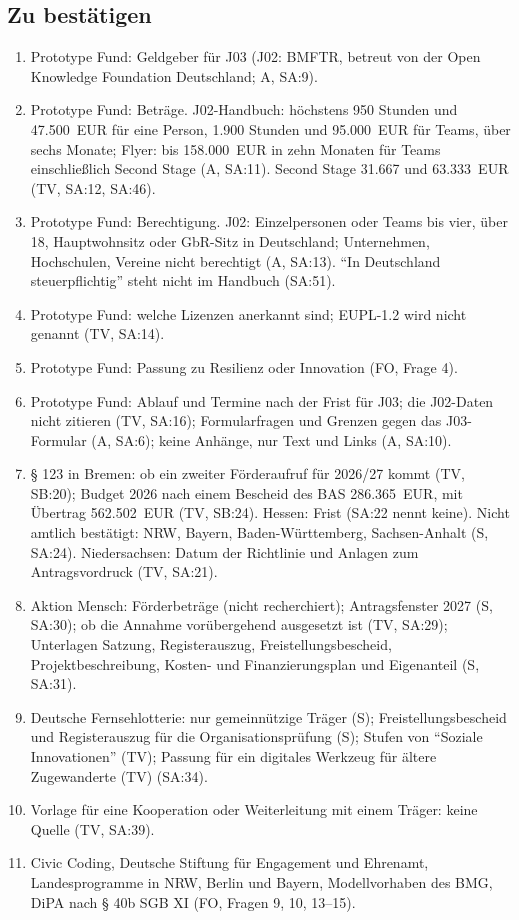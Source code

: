 \documentclass[10pt,parskip=half-]{scrartcl}
\begin{document}
\subsection{Zu bestätigen}
{\small
\begin{enumerate}[nosep]
  \item Prototype Fund: Geldgeber für J03 (J02: BMFTR, betreut von der Open Knowledge Foundation
    Deutschland; A, SA:9).
  \item Prototype Fund: Beträge. J02-Handbuch: höchstens 950 Stunden und 47.500~EUR für eine
    Person, 1.900 Stunden und 95.000~EUR für Teams, über sechs Monate; Flyer: bis 158.000~EUR in
    zehn Monaten für Teams einschließlich Second Stage (A, SA:11). Second Stage 31.667 und
    63.333~EUR (TV, SA:12, SA:46).
  \item Prototype Fund: Berechtigung. J02: Einzelpersonen oder Teams bis vier, über 18,
    Hauptwohnsitz oder GbR-Sitz in Deutschland; Unternehmen, Hochschulen, Vereine nicht
    berechtigt (A, SA:13). \enquote{In Deutschland steuerpflichtig} steht nicht im Handbuch
    (SA:51).
  \item Prototype Fund: welche Lizenzen anerkannt sind; EUPL-1.2 wird nicht genannt (TV, SA:14).
  \item Prototype Fund: Passung zu Resilienz oder Innovation (FO, Frage 4).
  \item Prototype Fund: Ablauf und Termine nach der Frist für J03; die J02-Daten nicht zitieren
    (TV, SA:16); Formularfragen und Grenzen gegen das J03-Formular (A, SA:6); keine Anhänge, nur
    Text und Links (A, SA:10).
  \item § 123 in Bremen: ob ein zweiter Förderaufruf für 2026/27 kommt (TV, SB:20); Budget 2026
    nach einem Bescheid des BAS 286.365~EUR, mit Übertrag 562.502~EUR (TV, SB:24). Hessen: Frist
    (SA:22 nennt keine). Nicht amtlich bestätigt: NRW, Bayern, Baden-Württemberg, Sachsen-Anhalt
    (S, SA:24). Niedersachsen: Datum der Richtlinie und Anlagen zum Antragsvordruck (TV, SA:21).
  \item Aktion Mensch: Förderbeträge (nicht recherchiert); Antragsfenster 2027 (S, SA:30); ob die Annahme vorübergehend ausgesetzt ist
    (TV, SA:29); Unterlagen Satzung, Registerauszug, Freistellungsbescheid, Projektbeschreibung,
    Kosten- und Finanzierungsplan und Eigenanteil (S, SA:31).
  \item Deutsche Fernsehlotterie: nur gemeinnützige Träger (S); Freistellungsbescheid und
    Registerauszug für die Organisationsprüfung (S); Stufen von \enquote{Soziale Innovationen}
    (TV); Passung für ein digitales Werkzeug für ältere Zugewanderte (TV) (SA:34).
  \item Vorlage für eine Kooperation oder Weiterleitung mit einem Träger: keine Quelle (TV,
    SA:39).
  \item Civic Coding, Deutsche Stiftung für Engagement und Ehrenamt, Landesprogramme in NRW,
    Berlin und Bayern, Modellvorhaben des BMG, DiPA nach § 40b SGB XI (FO, Fragen 9, 10, 13--15).
\end{enumerate}
}
\end{document}
